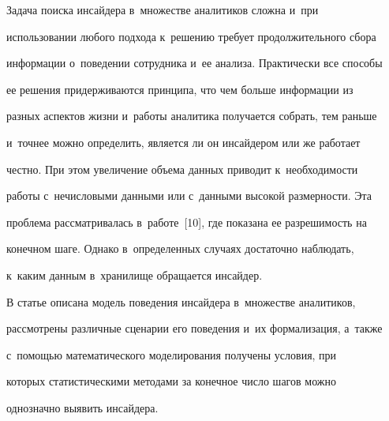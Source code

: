     


    \vspace*{-3pt}


    


  Задача поиска инсайдера в~множестве аналитиков сложна и~при 


использовании любого подхода к~решению требует продолжительного сбора 


информации о~поведении сотрудника и~ее анализа. Практически все способы 


ее решения придерживаются прин\-ци\-па, что чем больше информации из 


разных аспектов жизни и~работы аналитика получается собрать, тем раньше 


и~точнее можно определить, является ли он инсайдером или же работает 


чест\-но. При этом увеличение объема данных приводит к~необходимости 


работы с~нечисловыми данными или с~данными высокой размерности. Эта 


проблема рассматривалась в~работе~[10], где показана ее разрешимость на 


конечном шаге. Однако в~определенных случаях достаточно наблюдать, 


к~каким данным в~хранилище обращается инсайдер. 


  


  В статье описана модель поведения инсайдера в~множестве аналитиков, 


рассмотрены различные сценарии его поведения и~их формализация, а~также 


с~по\-мощью математического моделирования получены усло\-вия, при 


которых статистическими методами за конечное число шагов можно 


однозначно выявить инсайдера. 





\vspace*{-3pt}





